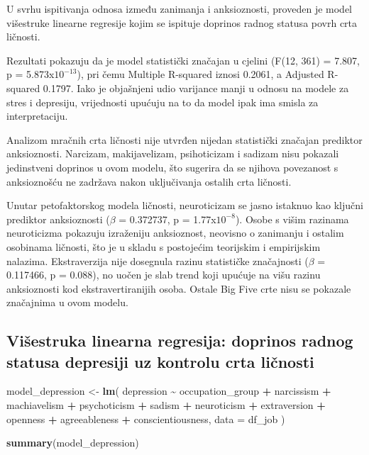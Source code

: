 \documentclass[
]{article}
\newenvironment{Shaded}{\begin{snugshade}}{\end{snugshade}}
\newcommand{\AttributeTok}[1]{\textcolor[rgb]{0.13,0.29,0.53}{#1}}
\newcommand{\FunctionTok}[1]{\textcolor[rgb]{0.13,0.29,0.53}{\textbf{#1}}}
\newcommand{\NormalTok}[1]{#1}
\newcommand{\OtherTok}[1]{\textcolor[rgb]{0.56,0.35,0.01}{#1}}
\newcommand{\SpecialCharTok}[1]{\textcolor[rgb]{0.81,0.36,0.00}{\textbf{#1}}}
\begin{document}
U svrhu ispitivanja odnosa između zanimanja i anksioznosti, proveden je
model višestruke linearne regresije kojim se ispituje doprinos radnog
statusa povrh crta ličnosti.

Rezultati pokazuju da je model statistički značajan u cjelini (F(12,
361) = 7.807, p = 5.873x\(10^{-13}\)), pri čemu Multiple R-squared
iznosi 0.2061, a Adjusted R-squared 0.1797. Iako je objašnjeni udio
varijance manji u odnosu na modele za stres i depresiju, vrijednosti
upućuju na to da model ipak ima smisla za interpretaciju.

Analizom mračnih crta ličnosti nije utvrđen nijedan statistički značajan
prediktor anksioznosti. Narcizam, makijavelizam, psihoticizam i sadizam
nisu pokazali jedinstveni doprinos u ovom modelu, što sugerira da se
njihova povezanost s anksioznošću ne zadržava nakon uključivanja ostalih
crta ličnosti.

Unutar petofaktorskog modela ličnosti, neuroticizam se jasno istaknuo
kao ključni prediktor anksioznosti (\(\beta\) = 0.372737, p =
1.77x\(10^{-8}\)). Osobe s višim razinama neuroticizma pokazuju
izraženiju anksioznost, neovisno o zanimanju i ostalim osobinama
ličnosti, što je u skladu s postojećim teorijskim i empirijskim
nalazima. Ekstraverzija nije dosegnula razinu statističke značajnosti
(\(\beta\) = 0.117466, p = 0.088), no uočen je slab trend koji upućuje
na višu razinu anksioznosti kod ekstravertiranijih osoba. Ostale Big
Five crte nisu se pokazale značajnima u ovom modelu.

\subsection{Višestruka linearna regresija: doprinos radnog statusa
depresiji uz kontrolu crta
ličnosti}\label{viux161estruka-linearna-regresija-doprinos-radnog-statusa-depresiji-uz-kontrolu-crta-liux10dnosti}

\begin{Shaded}
\begin{Highlighting}[]
\NormalTok{model\_depression }\OtherTok{\textless{}{-}} \FunctionTok{lm}\NormalTok{(}
\NormalTok{  depression }\SpecialCharTok{\textasciitilde{}}\NormalTok{ occupation\_group }\SpecialCharTok{+} 
\NormalTok{  narcissism }\SpecialCharTok{+}\NormalTok{ machiavelism }\SpecialCharTok{+}\NormalTok{ psychoticism }\SpecialCharTok{+}\NormalTok{ sadism }\SpecialCharTok{+}\NormalTok{ neuroticism }\SpecialCharTok{+}
\NormalTok{  extraversion }\SpecialCharTok{+}\NormalTok{ openness }\SpecialCharTok{+}\NormalTok{ agreeableness }\SpecialCharTok{+}\NormalTok{ conscientiousness,}
  \AttributeTok{data =}\NormalTok{ df\_job}
\NormalTok{)}

\FunctionTok{summary}\NormalTok{(model\_depression)}
\end{Highlighting}
\end{Shaded}
\end{document}
